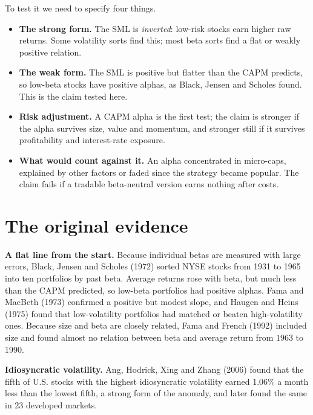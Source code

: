 To test it we need to specify four things.

\begin{itemize}
  \item \textbf{The strong form.} The SML is \emph{inverted}: low-risk stocks earn higher raw returns. Some volatility sorts find this; most beta sorts find a flat or weakly positive relation.
  \item \textbf{The weak form.} The SML is positive but flatter than the CAPM predicts, so low-beta stocks have positive alphas, as Black, Jensen and Scholes found. This is the claim tested here.
  \item \textbf{Risk adjustment.} A CAPM alpha is the first test; the claim is stronger if the alpha survives size, value and momentum, and stronger still if it survives profitability and interest-rate exposure.
  \item \textbf{What would count against it.} An alpha concentrated in micro-caps, explained by other factors or faded since the strategy became popular. The claim fails if a tradable beta-neutral version earns nothing after costs.
\end{itemize}

\section{The original evidence}
\label{sec:18-evidence}

\textbf{A flat line from the start.} Because individual betas are measured with large errors, Black, Jensen and Scholes (1972) sorted NYSE stocks from 1931 to 1965 into ten portfolios by past beta. Average returns rose with beta, but much less than the CAPM predicted, so low-beta portfolios had positive alphas. Fama and MacBeth (1973) confirmed a positive but modest slope, and Haugen and Heins (1975) found that low-volatility portfolios had matched or beaten high-volatility ones. Because size and beta are closely related, Fama and French (1992) included size and found almost no relation between beta and average return from 1963 to 1990.

\textbf{Idiosyncratic volatility.} Ang, Hodrick, Xing and Zhang (2006) found that the fifth of U.S. stocks with the highest idiosyncratic volatility earned 1.06\% a month less than the lowest fifth, a strong form of the anomaly, and later found the same in 23 developed markets.

